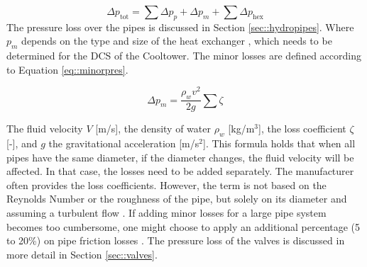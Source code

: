 \begin{equation}
    \Delta p_{\text{tot}} = \sum \Delta p_{p} + \Delta p_m + \sum \Delta p_{\text{hex}} 
\end{equation}
The pressure loss over the pipes is discussed in Section \ref{sec::hydropipes}. Where $p_m$ depends on the type and size of the heat exchanger \cite{YvoPutter}, which needs to be determined for the DCS of the Cooltower. The minor losses are defined according to Equation \ref{eq::minorpres}.

\begin{equation}\label{eq::minorpres}
    \Delta p_m = \frac{\rho_w v^2}{2g} \sum \zeta
\end{equation}

The fluid velocity $V$ [m/s], the density of water $\rho_w$ [kg/m$^3$], the loss coefficient $\zeta$ [-], and $g$ the gravitational acceleration [m/s$^2$]. This formula holds that when all pipes have the same diameter, if the diameter changes, the fluid velocity will be affected. In that case, the losses need to be added separately. The manufacturer often provides the loss coefficients. However, the term is not based on the Reynolds Number or the roughness of the pipe, but solely on its diameter and assuming a turbulent flow \cite{white2011fluid}. If adding minor losses for a large pipe system becomes too cumbersome, one might choose to apply an additional percentage (5 to 20\%) on pipe friction losses \cite{echtephdthesis}. The pressure loss of the valves is discussed in more detail in Section \ref{sec::valves}.



